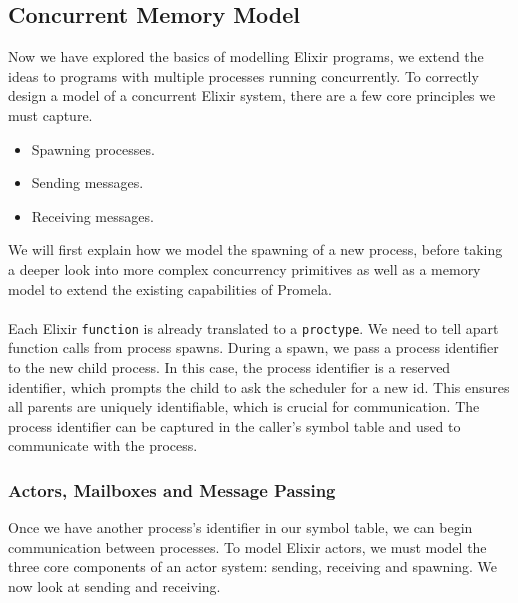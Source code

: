 \subsection{Concurrent Memory Model} \label{sec:memory_model}
Now we have explored the basics of modelling Elixir programs, we extend the ideas to programs with multiple processes running concurrently. To correctly design a model of a concurrent Elixir system, there are a few core principles we must capture.
\begin{itemize}
    \item Spawning processes.
    \item Sending messages.
    \item Receiving messages.
\end{itemize}
We will first explain how we model the spawning of a new process, before taking a deeper look into more complex concurrency primitives as well as a memory model to extend the existing capabilities of Promela. 
\\ \\
Each Elixir \texttt{function} is already translated to a \texttt{proctype}. We need to tell apart function calls from process spawns. During a spawn, we pass a process identifier to the new child process. In this case, the process identifier is a reserved identifier, which prompts the child to ask the scheduler for a new id. This ensures all parents are uniquely identifiable, which is crucial for communication. The process identifier can be captured in the caller's symbol table and used to communicate with the process.
\subsubsection{Actors, Mailboxes and Message Passing}
Once we have another process's identifier in our symbol table, we can begin communication between processes. To model Elixir actors, we must model the three core components of an actor system: sending, receiving and spawning. We now look at sending and receiving.
\\ \\
